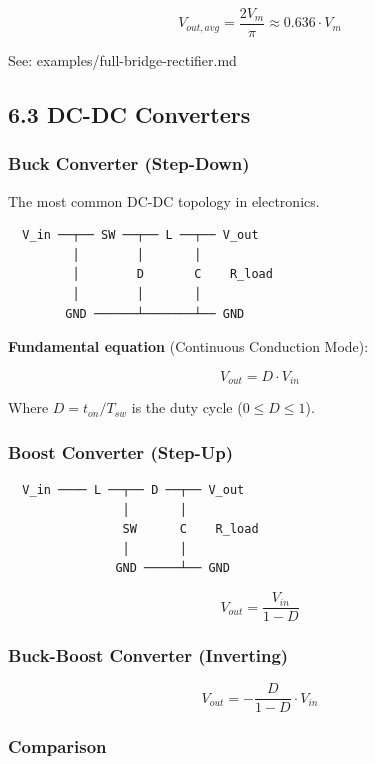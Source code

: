 \documentclass[11pt,a4paper]{book}
\begin{document}
\[V_{out,avg} = \frac{2V_m}{\pi} \approx 0.636 \cdot V_m\]

See: examples/full-bridge-rectifier.md

\medskip\noindent\hrulefill\medskip

\subsection{6.3 DC-DC Converters}

\subsubsection{Buck Converter (Step-Down)}

The most common DC-DC topology in electronics.

\begin{lstlisting}
  V_in ──┬── SW ──┬── L ──┬── V_out
         │        │       │
         │        D       C    R_load
         │        │       │
        GND ──────┴───────┴── GND
\end{lstlisting}

\textbf{Fundamental equation} (Continuous Conduction Mode):

\[\boxed{V_{out} = D \cdot V_{in}}\]

Where $D = t_{on} / T_{sw}$ is the duty cycle ($0 \leq D \leq 1$).

\subsubsection{Boost Converter (Step-Up)}

\begin{lstlisting}
  V_in ──── L ──┬── D ──┬── V_out
                │       │
                SW      C    R_load
                │       │
               GND ─────┴── GND
\end{lstlisting}

\[\boxed{V_{out} = \frac{V_{in}}{1 - D}}\]

\subsubsection{Buck-Boost Converter (Inverting)}

\[\boxed{V_{out} = -\frac{D}{1-D} \cdot V_{in}}\]

\subsubsection{Comparison}
\end{document}
